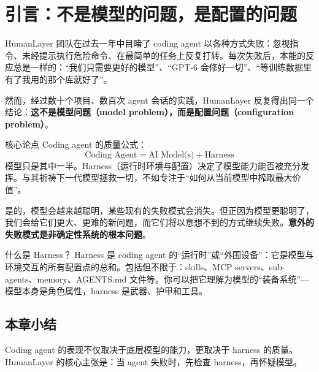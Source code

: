 \section{引言：不是模型的问题，是配置的问题}

HumanLayer 团队在过去一年中目睹了 coding agent 以各种方式失败：忽视指令、未经提示执行危险命令、在最简单的任务上反复打转。每次失败后，本能的反应总是一样的：``我们只需要更好的模型''、``GPT-6 会修好一切''、``等训练数据里有了我用的那个库就好了''。

然而，经过数十个项目、数百次 agent 会话的实践，HumanLayer 反复得出同一个结论：\textbf{这不是模型问题（model problem），而是配置问题（configuration problem）}。

\begin{importantbox}{核心论点}
Coding agent 的质量公式：
$$\text{Coding Agent} = \text{AI Model(s)} + \text{Harness}$$
模型只是其中一半。Harness（运行时环境与配置）决定了模型能力能否被充分发挥。与其祈祷下一代模型拯救一切，不如专注于``如何从当前模型中榨取最大价值''。
\end{importantbox}

是的，模型会越来越聪明，某些现有的失败模式会消失。但正因为模型更聪明了，我们会给它们更大、更难的新问题，而它们将以意想不到的方式继续失败。\textbf{意外的失败模式是非确定性系统的根本问题}。

\begin{knowledgebox}{什么是 Harness？}
Harness 是 coding agent 的``运行时''或``外围设备''：它是模型与环境交互的所有配置点的总和。包括但不限于：skills、MCP servers、sub-agents、memory、AGENTS.md 文件等。你可以把它理解为模型的``装备系统''---模型本身是角色属性，harness 是武器、护甲和工具。
\end{knowledgebox}

\subsection{本章小结}

Coding agent 的表现不仅取决于底层模型的能力，更取决于 harness 的质量。HumanLayer 的核心主张是：当 agent 失败时，先检查 harness，再怀疑模型。


